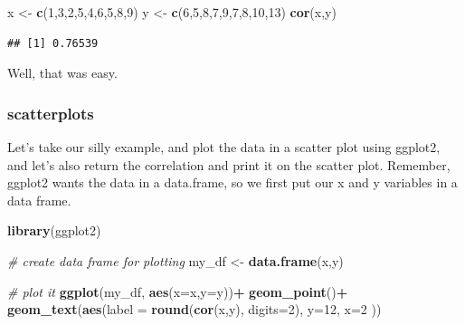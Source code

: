 \documentclass[]{book}
\newenvironment{Shaded}{\begin{snugshade}}{\end{snugshade}}
\newcommand{\KeywordTok}[1]{\textcolor[rgb]{0.13,0.29,0.53}{\textbf{#1}}}
\newcommand{\DataTypeTok}[1]{\textcolor[rgb]{0.13,0.29,0.53}{#1}}
\newcommand{\DecValTok}[1]{\textcolor[rgb]{0.00,0.00,0.81}{#1}}
\newcommand{\StringTok}[1]{\textcolor[rgb]{0.31,0.60,0.02}{#1}}
\newcommand{\CommentTok}[1]{\textcolor[rgb]{0.56,0.35,0.01}{\textit{#1}}}
\newcommand{\OperatorTok}[1]{\textcolor[rgb]{0.81,0.36,0.00}{\textbf{#1}}}
\newcommand{\NormalTok}[1]{#1}
\begin{document}
\begin{Shaded}
\begin{Highlighting}[]
\NormalTok{x  <-}\StringTok{ }\KeywordTok{c}\NormalTok{(}\DecValTok{1}\NormalTok{,}\DecValTok{3}\NormalTok{,}\DecValTok{2}\NormalTok{,}\DecValTok{5}\NormalTok{,}\DecValTok{4}\NormalTok{,}\DecValTok{6}\NormalTok{,}\DecValTok{5}\NormalTok{,}\DecValTok{8}\NormalTok{,}\DecValTok{9}\NormalTok{)}
\NormalTok{y  <-}\StringTok{ }\KeywordTok{c}\NormalTok{(}\DecValTok{6}\NormalTok{,}\DecValTok{5}\NormalTok{,}\DecValTok{8}\NormalTok{,}\DecValTok{7}\NormalTok{,}\DecValTok{9}\NormalTok{,}\DecValTok{7}\NormalTok{,}\DecValTok{8}\NormalTok{,}\DecValTok{10}\NormalTok{,}\DecValTok{13}\NormalTok{)}
\KeywordTok{cor}\NormalTok{(x,y)}
\end{Highlighting}
\end{Shaded}

\begin{verbatim}
## [1] 0.76539
\end{verbatim}

Well, that was easy.

\subsubsection{scatterplots}\label{scatterplots-1}

Let's take our silly example, and plot the data in a scatter plot using
ggplot2, and let's also return the correlation and print it on the
scatter plot. Remember, ggplot2 wants the data in a data.frame, so we
first put our x and y variables in a data frame.

\begin{Shaded}
\begin{Highlighting}[]
\KeywordTok{library}\NormalTok{(ggplot2)}

\CommentTok{# create data frame for plotting}
\NormalTok{my_df <-}\StringTok{ }\KeywordTok{data.frame}\NormalTok{(x,y)}

\CommentTok{# plot it}
\KeywordTok{ggplot}\NormalTok{(my_df, }\KeywordTok{aes}\NormalTok{(}\DataTypeTok{x=}\NormalTok{x,}\DataTypeTok{y=}\NormalTok{y))}\OperatorTok{+}
\StringTok{  }\KeywordTok{geom_point}\NormalTok{()}\OperatorTok{+}
\StringTok{  }\KeywordTok{geom_text}\NormalTok{(}\KeywordTok{aes}\NormalTok{(}\DataTypeTok{label =} \KeywordTok{round}\NormalTok{(}\KeywordTok{cor}\NormalTok{(x,y), }\DataTypeTok{digits=}\DecValTok{2}\NormalTok{), }\DataTypeTok{y=}\DecValTok{12}\NormalTok{, }\DataTypeTok{x=}\DecValTok{2}\NormalTok{ ))}
\end{Highlighting}
\end{Shaded}
\end{document}
